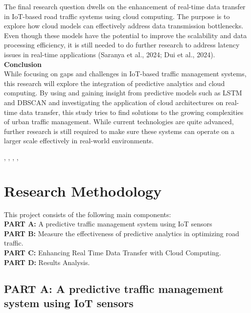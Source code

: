 \documentclass[12pt,a4paper]{article}
\begin{document}
The final research question dwells on the enhancement of real-time data transfer in IoT-based road traffic systems using cloud computing. The purpose is to explore how cloud models can effectively address data transmission bottlenecks. Even though these models have the potential to improve the scalability and data processing efficiency, it is still needed to do further research to address latency issues in real-time applications (Saranya et al., 2024; Dui et al., 2024). \\

\textbf{Conclusion }\\

While focusing on gaps and challenges in IoT-based traffic management systems, this research will explore the integration of predictive analytics and cloud computing. By using and gaining insight from predictive models such as LSTM and DBSCAN and investigating the application of cloud architectures on real-time data transfer, this study tries to find solutions to the growing complexities of urban traffic management. While current technologies are quite advanced, further research is still required to make sure these systems can operate on a larger scale effectively in real-world environments. 
 
\cite{10384717}, \cite{10568678}, \cite{10575594}, \cite{9914294}, \cite{9931585}

\newpage

\section{Research Methodology }

This project consists of the following main components: \\

\textbf{PART A:} A predictive traffic management system using IoT sensors \\

\textbf{PART B:} Measure the effectiveness of predictive analytics in optimizing road traffic.\\

\textbf{PART C:} Enhancing Real Time Data Transfer with Cloud Computing.\\ 

\textbf{PART D:} Results Analysis.\\

\subsection{PART A: A predictive traffic management system using IoT sensors }
\end{document}
